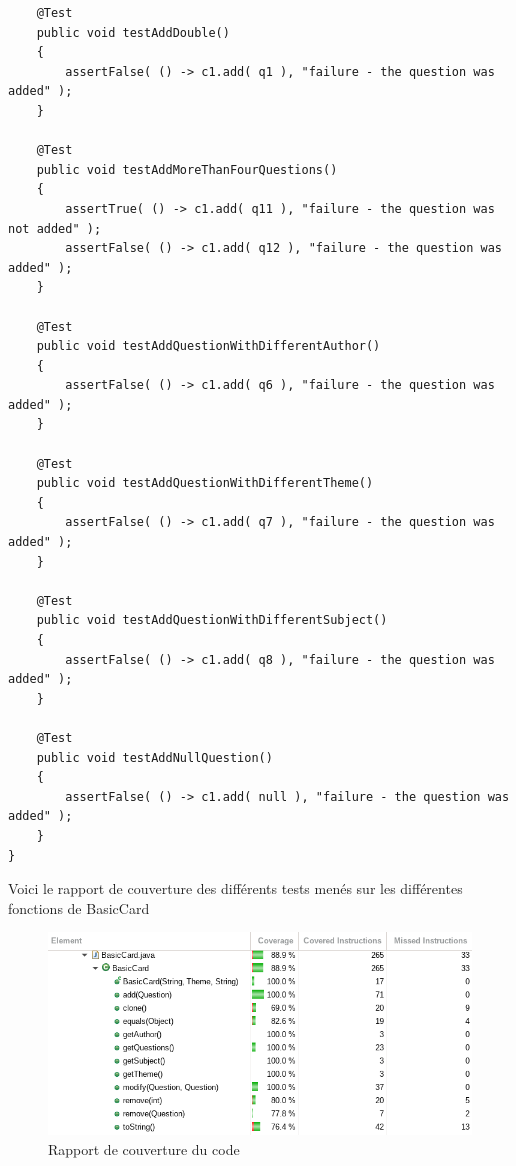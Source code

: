 \begin{lstlisting}
    @Test
    public void testAddDouble()
    {
        assertFalse( () -> c1.add( q1 ), "failure - the question was added" );
    }

    @Test
    public void testAddMoreThanFourQuestions()
    {
        assertTrue( () -> c1.add( q11 ), "failure - the question was not added" );
        assertFalse( () -> c1.add( q12 ), "failure - the question was added" );
    }

    @Test
    public void testAddQuestionWithDifferentAuthor()
    {
        assertFalse( () -> c1.add( q6 ), "failure - the question was added" );
    }

    @Test
    public void testAddQuestionWithDifferentTheme()
    {
        assertFalse( () -> c1.add( q7 ), "failure - the question was added" );
    }

    @Test
    public void testAddQuestionWithDifferentSubject()
    {
        assertFalse( () -> c1.add( q8 ), "failure - the question was added" );
    }

    @Test
    public void testAddNullQuestion()
    {
        assertFalse( () -> c1.add( null ), "failure - the question was added" );
    }
}
\end{lstlisting}

\newpage
Voici le rapport de couverture des différents tests menés sur les différentes fonctions de BasicCard

\begin{figure}[h]
	\centering
	\includegraphics[width=\textwidth]{junit_coverage.png}
	\caption{Rapport de couverture du code}
	\label{fig:diag_coverage}
\end{figure}

